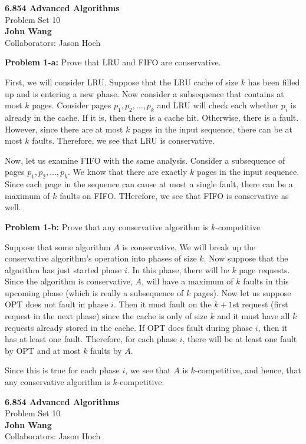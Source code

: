 \documentclass[psamsfonts]{amsart}
\newenvironment{sol}{\vspace{0.25cm}{\large \bfseries Solution:}}{\qedsymbol}
\newenvironment{prob}[1]{\begin{framed}{\large \bfseries Problem #1:}}{\end{framed}}
\newcommand{\makenewtitle}{
    \begin{center}
    {\huge \bfseries 6.854 Advanced Algorithms} \\
    Problem Set 10\\
    \vspace{0.25cm}
    {\bfseries John Wang} \\
    Collaborators: Jason Hoch 
    \end{center}
    \vspace{0.5cm}
}
\begin{document}
\makenewtitle

\begin{prob}{1-a}
Prove that LRU and FIFO are conservative.
\end{prob}
\begin{sol}
First, we will consider LRU. Suppose that the LRU cache of size $k$ has been filled up and is entering a new phase. Now consider a subsequence that contains at most $k$ pages. Consider pages $p_1, p_2, \ldots, p_k$ and LRU will check each whether $p_i$ is already in the cache. If it is, then there is a cache hit. Otherwise, there is a fault. However, since there are at most $k$ pages in the input sequence, there can be at most $k$ faults. Therefore, we see that LRU is conservative.

Now, let us examine FIFO with the same analysis. Consider a subsequence of pages $p_1, p_2, \ldots, p_k$. We know that there are exactly $k$ pages in the input sequence. Since each page in the sequence can cause at most a single fault, there can be a maximum of $k$ faults on FIFO. THerefore, we see that FIFO is conservative as well.
\end{sol}

\begin{prob}{1-b}
Prove that any conservative algorithm is $k$-competitive
\end{prob}
\begin{sol}
Suppose that some algorithm $A$ is conservative. We will break up the conservative algorithm's operation into phases of size $k$. Now suppose that the algorithm has just started phase $i$. In this phase, there will be $k$ page requests. Since the algorithm is conservative, $A$, will have a maximum of $k$ faults in this upcoming phase (which is really a subsequence of $k$ pages). Now let us suppose OPT does not fault in phase $i$. Then it must fault on the $k+1$st request (first request in the next phase) since the cache is only of size $k$ and it must have all $k$ requests already stored in the cache. If OPT does fault during phase $i$, then it has at least one fault. Therefore, for each phase $i$, there will be at least one fault by OPT and at most $k$ faults by $A$. 

Since this is true for each phase $i$, we see that $A$ is $k$-competitive, and hence, that any conservative algorithm is $k$-competitive.
\end{sol}

\newpage
\makenewtitle
\end{document}
